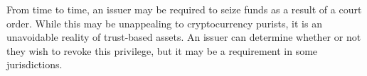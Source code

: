 From time to time, an issuer may be required to seize funds as a result of a
court order. While this may be unappealing to cryptocurrency purists, it is an
unavoidable reality of trust-based assets. An issuer can determine whether or
not they wish to revoke this privilege, but it may be a requirement in some
jurisdictions.
